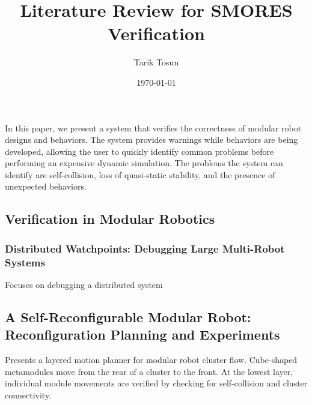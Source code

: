 \documentclass[12pt]{article}
\title{Literature Review for SMORES Verification}
\author{Tarik Tosun}
\date{\today}
\begin{document}
\maketitle

In this paper, we present a system that verifies the correctness of modular robot designs and behaviors.  The system provides warnings while behaviors are being developed, allowing the user to quickly identify common problems before performing an expensive dynamic simulation. The problems the system can identify are self-collision, loss of quasi-static stability, and the presence of unexpected behaviors.

\subsection*{Verification in Modular Robotics}
\subsubsection*{ Distributed Watchpoints: Debugging Large Multi-Robot Systems \cite{de2008distributed} }
Focuses on debugging a distributed system

\subsection*{ A Self-Reconfigurable Modular Robot: Reconfiguration Planning and Experiments \cite{yoshida2002self} }
Presents a layered motion planner for modular robot cluster flow. Cube-shaped metamodules move from the rear of a cluster to the front. At the lowest layer, individual module movements are verified by checking for self-collision and cluster connectivity.

\subsection*{  } 



\end{document}
